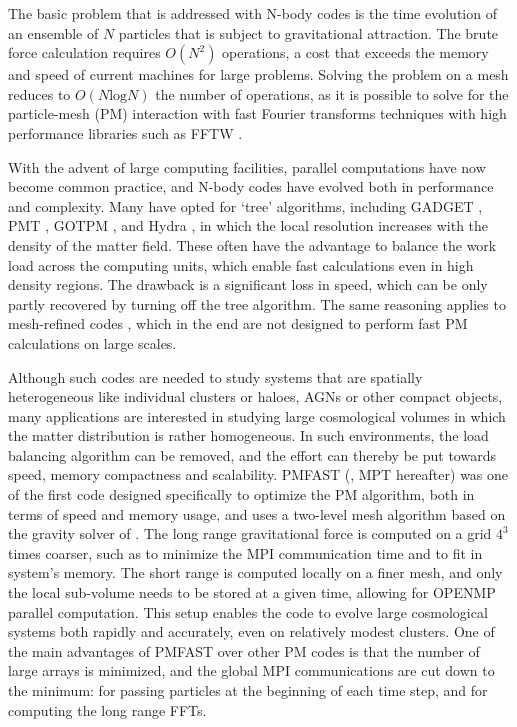 \documentclass[useAMS,usenatbib]{mn2e}
\begin{document}
The basic problem that is addressed with N-body codes is the time evolution of an ensemble of $N$ particles
that is subject to gravitational attraction. 
The brute force calculation requires $O(N^{2})$ operations, a cost that 
exceeds the memory and speed of current machines for large problems.
Solving the problem  on a mesh \citep{1981csup.book.....H} reduces to $O(N\mbox{log}N)$ the number of operations,
as it is possible to solve for the particle-mesh (PM) interaction with fast Fourier transforms techniques with high performance libraries such as {\small FFTW} \citep{FFTW3}.


With the advent of large computing facilities, parallel computations have now become 
common practice, and N-body codes have evolved both in performance and complexity. 
Many have opted for  `tree' algorithms, including {\small GADGET} \citep{2001NewA....6...79S, 2005MNRAS.364.1105S}, {\small PMT} \citep{1995ApJS...98..355X}, {\small GOTPM} \citep{2004NewA....9..111D}, and Hydra \citep{1995ApJ...452..797C}, in which the local resolution increases with the density of the matter field. 
These often have the advantage to balance the work load across the computing units, which enable fast calculations even in high density regions. 
The drawback is a significant loss in speed, which can be only partly recovered by turning off the tree algorithm. 
The same reasoning applies to mesh-refined codes  \citep{1991ApJ...368L..23C}, 
which in the end are not designed to perform fast PM calculations on large scales. 

Although such codes are needed to study systems that are spatially heterogeneous like individual clusters or haloes, AGNs or other compact objects,
many applications are interested in studying large cosmological volumes in which the matter distribution is rather homogeneous.
In such environments, the load balancing algorithm can be removed, and the effort
can thereby be put towards speed, memory compactness and scalability.  
{\small PMFAST} (\cite{2005NewA...10..393M}, MPT hereafter) was one of the first code designed specifically to optimize the PM algorithm,
both in terms of speed and memory usage, and uses a two-level mesh algorithm based on the gravity solver of \cite{2003AAS...203.9703T}.
The long range gravitational force is computed on a  grid $4^{3}$ times coarser, such as to minimize the {\small MPI} communication time
and to fit in system's memory. The short range is computed locally on a finer mesh, and only the local sub-volume needs 
to be stored at a given time, allowing for {\small OPENMP} parallel computation.
This setup enables the code to evolve large cosmological systems both rapidly and accurately, even on relatively modest clusters.
One of the main advantages of {\small PMFAST} over other PM codes is that the number of large arrays is minimized,
and the global {\small MPI} communications are cut down to the minimum: for passing particles at the beginning of each time step,
and  for computing the long range FFTs.
\end{document}

